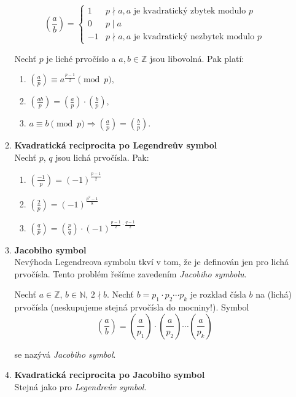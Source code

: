 \documentclass[12pt,a4paper]{article}
\begin{document}
\begin{enumerate}
\begin{enumerate}
			\[ \genfrac(){}{0}{a}{b} = \left\{
				\begin{array}{ll}
					1 & p \nmid a, a \text{ je kvadratický zbytek modulo } p \\
					0 & p \mid a \\
					-1& p \nmid a, a \text{ je kvadratický nezbytek modulo } p
				\end{array}
			\right. \]

			Nechť $p$ je liché prvočíslo a $a, b \in \mathbb{Z}$ jsou libovolná.
			Pak platí:

			\begin{enumerate}
				\item $\genfrac(){}{1}{a}{p} \equiv  a^{\frac{p-1}{2}} \pmod{p},$
				\item $\genfrac(){}{1}{ab}{p} = \genfrac(){}{1}{a}{p} \cdot
					\genfrac(){}{1}{b}{p},$
				\item $a \equiv b \pmod{p} \Rightarrow \genfrac(){}{1}{a}{p}
					= \genfrac(){}{1}{b}{p}.$
			\end{enumerate}

		\item \textbf{Kvadratická reciprocita po Legendreův symbol}\\
			Nechť $p$, $q$ jsou lichá prvočísla. Pak:

			\begin{enumerate}
				\item $\genfrac(){}{1}{-1}{p} = (-1)^{\frac{p-1}{2}}$
				\item $\genfrac(){}{1}{2}{p} = (-1)^{\frac{p^2-1}{8}}$
				\item $\genfrac(){}{1}{q}{p} = \genfrac(){}{1}{p}{q} \cdot
					(-1)^{\frac{p-1}{2} \cdot \frac{q-1}{2}}$
			\end{enumerate}

		\item \textbf{Jacobiho symbol}\\
			Nevýhoda Legendreova symbolu tkví v tom, že je definován jen pro
			lichá prvočísla. Tento problém řešíme zavedením \textit{Jacobiho
			symbolu}.

			Nechť $a \in \mathbb{Z}$, $b \in \mathbb{N}$, $2 \nmid b$. Nechť
			$b = p_1 \cdot p_2 \cdots p_k$ je rozklad čísla $b$ na (lichá)
			prvočísla (neskupujeme stejná prvočísla do mocniny!). Symbol
			\[ \genfrac(){}{0}{a}{b} = \genfrac(){}{0}{a}{p_1} \cdot
				\genfrac(){}{0}{a}{p_2} \cdots \genfrac(){}{0}{a}{p_k} \]

			se nazývá \textit{Jacobiho symbol}.

		\item \textbf{Kvadratická reciprocita po Jacobiho symbol}\\
			Stejná jako pro \textit{Legendreův symbol}.

	\end{enumerate}

\end{enumerate}
\end{document}
